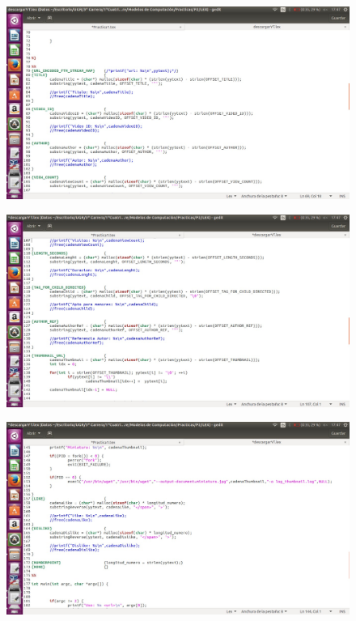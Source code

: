 \documentclass{article}
\begin{document}
\begin{figure}[!hp]
\includegraphics[width=\textwidth]{Captura de pantalla de 2018-01-07 17-47-06.jpg}
\centering 
\end{figure}

\begin{figure}[!hp]
\includegraphics[width=\textwidth]{Captura de pantalla de 2018-01-07 17-47-23.jpg} 
\centering
\end{figure}

\begin{figure}[!hp]
\includegraphics[width=\textwidth]{Captura de pantalla de 2018-01-07 17-47-31.jpg} 
\centering
\end{figure}
\end{document}
